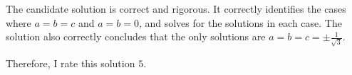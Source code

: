 The candidate solution is correct and rigorous. It correctly identifies the cases where $a=b=c$ and $a=b=0$, and solves for the solutions in each case. The solution also correctly concludes that the only solutions are $a=b=c=\pm \frac{1}{\sqrt{3}}$. 

Therefore, I rate this solution $\boxed{5}$.
